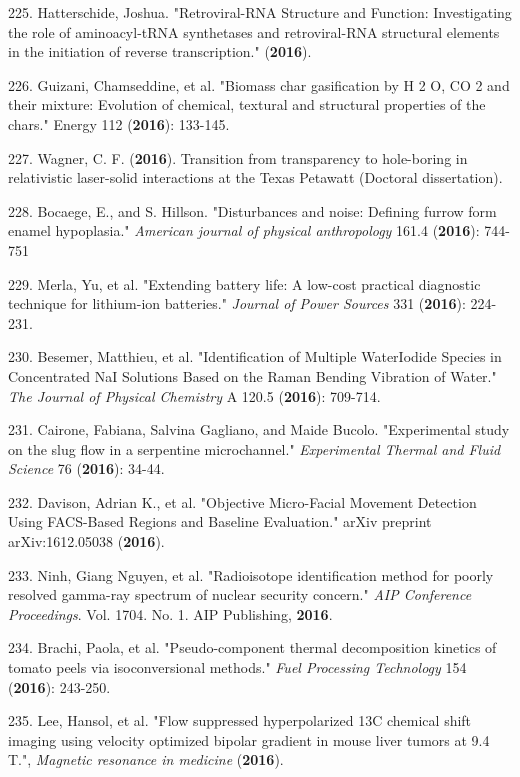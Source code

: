 225. Hatterschide, Joshua. "Retroviral-RNA Structure and Function: Investigating the role of aminoacyl-tRNA synthetases and retroviral-RNA structural elements in the initiation of reverse transcription." (\textbf{2016}).

226. Guizani, Chamseddine, et al. "Biomass char gasification by H 2 O, CO 2 and their mixture: Evolution of chemical, textural and structural properties of the chars." Energy 112 (\textbf{2016}): 133-145.

227. Wagner, C. F. (\textbf{2016}). Transition from transparency to hole-boring in relativistic laser-solid interactions at the Texas Petawatt (Doctoral dissertation).

228. Bocaege, E., and S. Hillson. "Disturbances and noise: Defining furrow form enamel hypoplasia." \textit{American journal of physical anthropology} 161.4 (\textbf{2016}): 744-751

229. Merla, Yu, et al. "Extending battery life: A low-cost practical diagnostic technique for lithium-ion batteries." \textit{Journal of Power Sources} 331 (\textbf{2016}): 224-231.

230. Besemer, Matthieu, et al. "Identification of Multiple Water\textendash{}Iodide Species in Concentrated NaI Solutions Based on the Raman Bending Vibration of Water." \textit{The Journal of Physical Chemistry} A 120.5 (\textbf{2016}): 709-714.

231. Cairone, Fabiana, Salvina Gagliano, and Maide Bucolo. "Experimental study on the slug flow in a serpentine microchannel." \textit{Experimental Thermal and Fluid Science} 76 (\textbf{2016}): 34-44.

232. Davison, Adrian K., et al. "Objective Micro-Facial Movement Detection Using FACS-Based Regions and Baseline Evaluation." arXiv preprint arXiv:1612.05038 (\textbf{2016}).

233. Ninh, Giang Nguyen, et al. "Radioisotope identification method for poorly resolved gamma-ray spectrum of nuclear security concern." \textit{AIP Conference Proceedings}. Vol. 1704. No. 1. AIP Publishing, \textbf{2016}.

234. Brachi, Paola, et al. "Pseudo-component thermal decomposition kinetics of tomato peels via isoconversional methods." \textit{Fuel Processing Technology} 154 (\textbf{2016}): 243-250.

235. Lee, Hansol, et al. "Flow suppressed hyperpolarized 13C chemical shift imaging using velocity optimized bipolar gradient in mouse liver tumors at 9.4 T.", \textit{Magnetic resonance in medicine} (\textbf{2016}).

